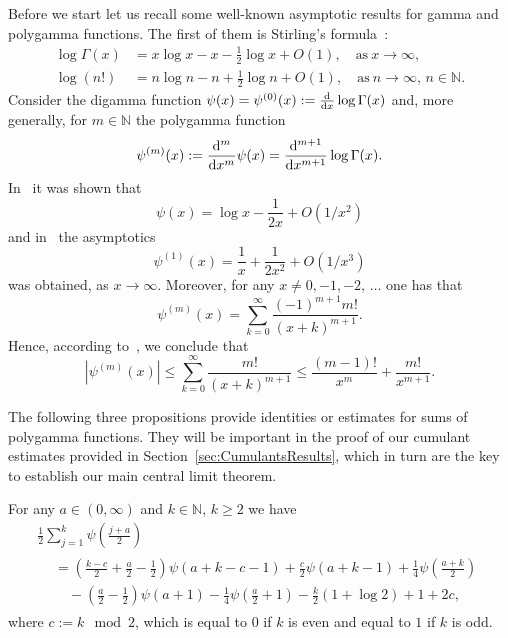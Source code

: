 \documentclass[10pt]{amsart}
\theoremstyle{definition}\newtheorem{defi}[theo]{Definition}\newtheorem{rema}[theo]{Remark}\newtheorem{exam}[theo]{Example}\newtheorem{exem}[theo]{Example}\newtheorem{nota}[theo]{Notation}
\newcommand{\N}{\mathbb{N}}
\newcommand{\dd}{{\rm d}}
\begin{document}
Before we start let us recall some well-known asymptotic results for gamma and polygamma functions. The first of them is Stirling's formula~\cite[p.~140]{NIST}:
\begin{align}
\log\Gamma(x)&=x\log x-x-\frac12\log x+O(1),\quad \text{as}\ x\rightarrow\infty,\label{eq:AsympGamma}
\\
\log(n!)&=n\log n-n+\frac12 \log n+O(1),\quad\text{as}\ n\to\infty,\, n\in\mathbb{N}.\label{eq:Stirling}
\end{align}
Consider the digamma function $\psi(x)=\psi^{(0)}(x):=\frac{\dd}{\dd x}\log\Gamma(x)$ and, more generally, for $m\in\mathbb{N}$ the polygamma function
\[
\psi^{(m)}(x):=\frac{\dd^m}{\dd x^m}\psi(x)=\frac{\dd^{m+1}}{\dd x^{m+1}}\log\Gamma(x).
\]
In~\cite[Theorem~C]{QV04} it was shown that
\begin{equation}\label{eq:AsympDigamma}
\psi(x)=\log x-\frac{1}{2x}+O\left(1/x^{2}\right)
\end{equation}
and in~\cite{Mor10} the asymptotics
\begin{equation}\label{eq:AsympPolygamma}
\psi^{(1)}(x)=\frac{1}{x}+\frac{1}{2x^2}+O\left(1/x^{3}\right)
\end{equation}
was obtained, as $x\rightarrow\infty$. Moreover, for any $x\neq 0,-1,-2,\,\ldots$ one has that
\begin{equation}\label{eq:PolygammaSeriesFormula}
\psi^{(m)}(x)=\sum\limits_{k=0}^{\infty}\frac{(-1)^{m+1}m!}{(x+k)^{m+1}}.
\end{equation}
Hence, according to~\cite[p.~260]{AS64}, we conclude that
\begin{equation}\label{eq:PolygammaBound}
\left|\psi^{(m)}(x)\right|\leq \sum_{k=0}^{\infty}\frac{m!}{(x+k)^{m+1}}\leq\frac{(m-1)!}{x^m}+\frac{m!}{x^{m+1}}.
\end{equation}

The following three propositions provide identities or estimates for sums of polyg\-amma functions. They will be important in the proof of our cumulant estimates provided in Section~\ref{sec:CumulantsResults}, which in turn are the key to establish our main central limit theorem.

\begin{prop}\label{prop:DigammaSum}
For any $a\in(0,\infty)$ and $k\in\N$, $k\ge 2$ we have
\begin{multline*}
\frac12\sum\limits_{j=1}^k\psi\left(\frac{j+a}{2}\right)\\
\begin{aligned}
&=\left(\frac{k-c}{2}+\frac{a}{2}-\frac{1}{2}\right)\psi (a+k-c-1)+\frac{c}{2}\psi(a+k-1)+\frac{1}{4}\psi\left(\frac{a+k}{2}\right)\\
&\quad-\left(\frac{a}{2}-\frac{1}{2}\right)\psi(a+1)-\frac{1}{4}\psi\left(\frac{a}{2}+1\right)-\frac{k}{2}\left(1+\log 2\right) +1+2c,
\end{aligned}
\end{multline*}
where $c:= k\mod 2$, which is equal to $0$ if $k$ is even and equal to $1$ if $k$ is odd.
\end{prop}
\end{document}
